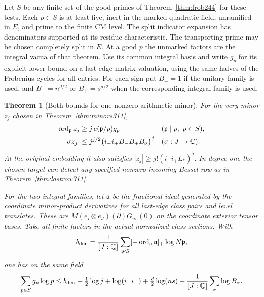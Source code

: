 \documentclass[a4paper,11pt]{article}
\newtheorem{theorem}[proposition]{Theorem}
\theoremstyle{definition}
\theoremstyle{remark}
\numberwithin{equation}{section}
\begin{document}
Let \(S\) be any finite set of the good primes of
Theorem~\ref{thm:frob244} for these tests. Each \(p\in S\)
is at least five, inert in the marked quadratic field, unramified
in \(E\), and prime to the finite CM level. The split indicator expansion
has denominators supported at its residue characteristic.
The transporting prime may be chosen completely split in
\(E\). At a good \(p\) the unmarked factors are the integral
vacua of that theorem. Use its common integral basis and
write \(g_p\) for its explicit lower bound on a last-edge
matrix valuation, using the same halves of the Frobenius
cycles for all entries. For each sign put \(B_\pm=1\) if
the unitary family is used, and \(B_-=n^{d/2}\) or
\(B_+=s^{d/2}\) when the corresponding integral family is used.

\begin{theorem}[Both bounds for one nonzero arithmetic minor]\leavevmode
\label{thm:bothlast311}
For the very minor \(z_j\) chosen in Theorem~\ref{thm:minors311},
\[
 \begin{aligned}
  \operatorname{ord}_{\mathfrak p} z_j
       &\ge j\,e(\mathfrak p/p)g_p
                 &&(\mathfrak p\mid p,\ p\in S),\\
  |\sigma z_j|
       &\le j^{j/2}\big(i_-i_+B_-B_+ B_\sigma\big)^j
                 &&(\sigma:J\to\mathbb C).
 \end{aligned}
\]
At the original embedding it also satisfies
\(|z_j|\ge j!(i_-i_+L_*)^j\). In degree one the chosen
target can detect any specified nonzero incoming Bessel row
as in Theorem~\ref{thm:lastrow311}.

For the two integral families, let \(\mathfrak a\) be the
fractional ideal generated by the coordinate minor-product
derivatives for all last-edge class pairs and level translates.
These are \(M(e_I\otimes e_J)(\partial)G_{uv}(0)\) on the
coordinate exterior tensor bases. Take all finite factors in
the actual normalized class sections. With
\[
 b_{\rm den}=\frac{1}{[J:\mathbb Q]}
      \sum_{\mathfrak p\nmid S}
        [-\operatorname{ord}_{\mathfrak p}\mathfrak a]_+
                                             \log N\mathfrak p ,
\]
one has on the same field
\[
 \sum_{p\in S}g_p\log p
 \le b_{\rm den}+\tfrac12\log j
       +\log(i_-i_+)+\tfrac d2\log(ns)
       +\frac{1}{[J:\mathbb Q]}\sum_\sigma\log B_\sigma .
\]
\end{theorem}
\end{document}
